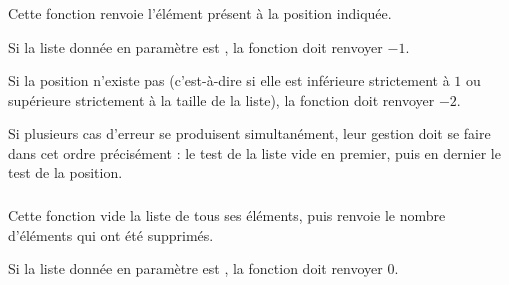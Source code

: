 \subsubsection*{}

\noindent Cette fonction renvoie l'élément présent à la position indiquée.

\smallskip

\noindent Si la liste donnée en paramètre est , la fonction doit renvoyer $ -1 $.

\noindent Si la position n'existe pas (c'est-à-dire si elle est inférieure strictement à $ 1 $ ou supérieure strictement à la taille de la liste), la fonction doit renvoyer $ -2 $.

\smallskip

\noindent Si plusieurs cas d'erreur se produisent simultanément, leur gestion doit se faire dans cet ordre précisément : le test de la liste vide en premier, puis en dernier le test de la position.

\bigskip


\subsubsection*{}

\noindent Cette fonction vide la liste de tous ses éléments, puis renvoie le nombre d'éléments qui ont été supprimés.

\smallskip

\noindent Si la liste donnée en paramètre est , la fonction doit renvoyer $ 0 $.
